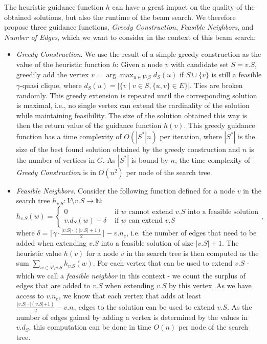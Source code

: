 \documentclass[draft,final]{vutinfth} %
\begin{document}
The heuristic guidance function $h$ can have a great impact on the quality of the obtained solutions, but also the runtime of the beam search. We therefore propose three guidance functions, \emph{Greedy Construction}, \emph{Feasible Neighbors}, and \emph{Number of Edges}, which we want to consider in the context of this beam search: 
\begin{itemize}
    \item \emph{Greedy Construction}. We use the result of a simple greedy construction as the value of the heuristic function $h$: Given a node $v$ with candidate set $S = v.S$, greedily add the vertex $v = \arg \max_{u \in V \setminus S} d_S(u)$ if $S \cup \{v\}$ is still a feasible $\gamma$-quasi clique, where $d_S(u) = |\{v \mid v \in S, \{u,v\} \in E \}|$. 
    Ties are broken randomly. This greedy extension is repeated until the corresponding solution is maximal, i.e., no single vertex can extend the cardinality of the solution while maintaining feasibility. 
    The size of the solution obtained this way is then the return value of the guidance function $h(v)$. This greedy guidance function has a time complexity of $O(|S^*|n)$ per iteration, where $|S^*|$ is the size of the best found solution obtained by the greedy construction and $n$ is the number of vertices in $G$. As $|S^*|$ is bound by $n$, the time complexity of \emph{Greedy Construction} is in $O(n^2)$ per node of the search tree. 
    \item \emph{Feasible Neighbors}. Consider the following function defined for a node $v$ in the search tree $h_{v.S} \colon V \setminus v.S \rightarrow \mathbb{N}$: 
    \[
        h_{v.S}(w) = 
        \begin{cases}
            0 & \text{ if $w$ cannot extend $v.S$ into a feasible solution}\\
            \mathit{v.d_S}(w) - \delta & \text{ if $w$ can extend $v.S$ }
        \end{cases},
    \]
    where $\delta = \lceil \gamma \cdot \frac{|v.S|\cdot (|v.S|+1)}{2} \rceil - v.n_e$, i.e. the number of edges that need to be added when extending $v.S$ into a feasible solution of size $|v.S|+1$. 
    The heuristic value $h(v)$ for a node $v$ in the search tree is then computed as the sum $\sum_{w \in V \setminus v.S} h_{v.S}(w)$. 
    For each vertex that can be used to extend $v.S$ - which we call a \emph{feasible neighbor} in this context - we count the surplus of edges that are added to $v.S$ when extending $v.S$ by this vertex. As we have access to $v.n_e$, we know that each vertex that adds at least $\frac{|v.S|\cdot|(v.S|+1)}{2} - v.n_e$ edges to the solution can be used to extend $v.S$. As the number of edges gained by adding a vertex is determined by the values in $v.d_S$, this computation can be done in time $O(n)$ per node of the search tree. 

\end{itemize}
\end{document}
